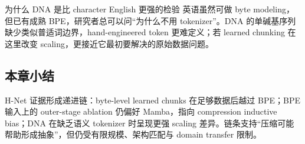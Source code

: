 \begin{knowledgebox}{为什么 DNA 是比 character English 更强的检验}
英语虽然可做 byte modeling，但已有成熟 BPE，研究者总可以问“为什么不用 tokenizer”。DNA 的单碱基序列缺少类似普适词边界，hand-engineered token 更难定义；若 learned chunking 在这里改变 scaling，更接近它最初要解决的原始数据问题。
\end{knowledgebox}


\subsection{本章小结}

H-Net 证据形成递进链：byte-level learned chunks 在足够数据后越过 BPE；BPE 输入上的 outer-stage ablation 仍偏好 Mamba，指向 compression inductive bias；DNA 在缺乏语义 tokenizer 时呈现更强 scaling 差异。链条支持“压缩可能帮助形成抽象”，但仍受有限规模、架构匹配与 domain transfer 限制。

